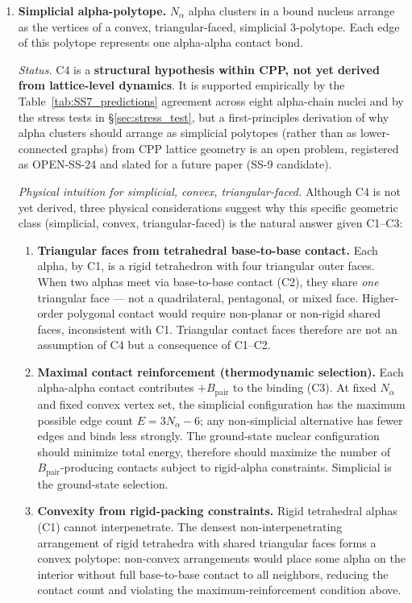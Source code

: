 \documentclass[11pt,letterpaper]{article}
\newcommand{\Bpair}{B_{\mathrm{pair}}}
\newcommand{\Nalpha}{N_{\alpha}}
\begin{document}
\begin{enumerate}[label=(C\arabic*)]
\item \textbf{Simplicial alpha-polytope.} $\Nalpha$ alpha clusters in a bound nucleus arrange as the vertices of a convex, triangular-faced, simplicial 3-polytope. Each edge of this polytope represents one alpha-alpha contact bond.

\emph{Status.} C4 is a \textbf{structural hypothesis within CPP, not yet derived from lattice-level dynamics}. It is supported empirically by the Table~\ref{tab:SS7_predictions} agreement across eight alpha-chain nuclei and by the stress tests in \S\ref{sec:stress_test}, but a first-principles derivation of why alpha clusters should arrange as simplicial polytopes (rather than as lower-connected graphs) from CPP lattice geometry is an open problem, registered as OPEN-SS-24 and slated for a future paper (SS-9 candidate).

\emph{Physical intuition for simplicial, convex, triangular-faced.} Although C4 is not yet derived, three physical considerations suggest why this specific geometric class (simplicial, convex, triangular-faced) is the natural answer given C1--C3:

\begin{enumerate}
\item \textbf{Triangular faces from tetrahedral base-to-base contact.} Each alpha, by C1, is a rigid tetrahedron with four triangular outer faces. When two alphas meet via base-to-base contact (C2), they share \emph{one} triangular face --- not a quadrilateral, pentagonal, or mixed face. Higher-order polygonal contact would require non-planar or non-rigid shared faces, inconsistent with C1. Triangular contact faces therefore are not an assumption of C4 but a consequence of C1--C2.

\item \textbf{Maximal contact reinforcement (thermodynamic selection).} Each alpha-alpha contact contributes $+\Bpair$ to the binding (C3). At fixed $\Nalpha$ and fixed convex vertex set, the simplicial configuration has the maximum possible edge count $E = 3\Nalpha - 6$; any non-simplicial alternative has fewer edges and binds less strongly. The ground-state nuclear configuration should minimize total energy, therefore should maximize the number of $\Bpair$-producing contacts subject to rigid-alpha constraints. Simplicial is the ground-state selection.

\item \textbf{Convexity from rigid-packing constraints.} Rigid tetrahedral alphas (C1) cannot interpenetrate. The densest non-interpenetrating arrangement of rigid tetrahedra with shared triangular faces forms a convex polytope: non-convex arrangements would place some alpha on the interior without full base-to-base contact to all neighbors, reducing the contact count and violating the maximum-reinforcement condition above.
\end{enumerate}


\end{enumerate}
\end{document}
